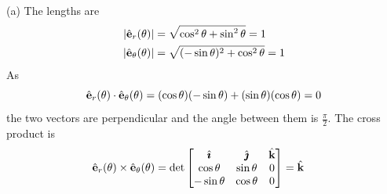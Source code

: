 \begin{solution} 
(a) The lengths are
\begin{align*}
|\hat{\mathbf{e}}_r(\theta)| &= \sqrt{\cos^2\theta+\sin^2\theta} = 1 \\
|\hat{\mathbf{e}}_\theta(\theta)| &= \sqrt{(-\sin\theta)^2+\cos^2\theta} = 1 
\end{align*}
As 
\begin{equation*}
\hat{\mathbf{e}}_r(\theta) \cdot \hat{\mathbf{e}}_\theta(\theta) = (\cos\theta)(-\sin\theta)
                                        +(\sin\theta)(\cos\theta)=0
\end{equation*}
the two vectors are perpendicular and the angle between them is 
$\frac{\pi}{2}$. The cross product is
\begin{align*}
\hat{\mathbf{e}}_r(\theta) \times \hat{\mathbf{e}}_\theta(\theta)
&=\det\left[\begin{matrix}
                  \hat{\pmb{\imath}}  &  \hat{\pmb{\jmath}}        & \hat{\mathbf{k}} \\
           \cos\theta  & \sin\theta  &  0  \\
          -\sin\theta  & \cos\theta  &  0
            \end{matrix}\right] =\hat{\mathbf{k}}
\end{align*}


\end{solution}
